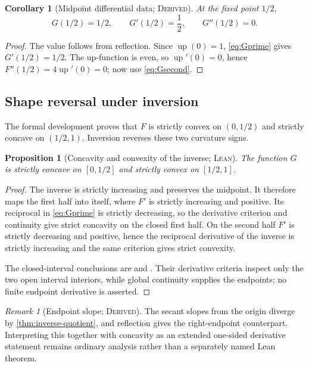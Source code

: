 \documentclass[11pt,oneside]{article}
\newtheorem{proposition}[theorem]{Proposition}
\newtheorem{corollary}[theorem]{Corollary}
\theoremstyle{definition}
\theoremstyle{remark}
\newtheorem{remark}[theorem]{Remark}
\newcommand{\Up}{\operatorname{up}}
\newcommand{\InvF}{G}
\newcommand{\Formalized}{\textsc{Lean}}
\newcommand{\Derived}{\textsc{Derived}}
\begin{document}
\begin{corollary}[Midpoint differential data; \Derived]
\label{cor:midpoint-inverse}
At the fixed point $1/2$,
\[
 \InvF(1/2)=1/2,\qquad
 \InvF'(1/2)=\frac12,\qquad
 \InvF''(1/2)=0.
\]
\end{corollary}

\begin{proof}
The value follows from reflection.  Since $\Up(0)=1$,
\eqref{eq:Gprime} gives $\InvF'(1/2)=1/2$.  The up-function is even, so
$\Up'(0)=0$, hence $F''(1/2)=4\Up'(0)=0$; now use
\eqref{eq:Gsecond}.
\end{proof}

\subsection{Shape reversal under inversion}

The formal development proves that $F$ is strictly convex on
$(0,1/2)$ and strictly concave on $(1/2,1)$.  Inversion reverses these
two curvature signs.

\begin{proposition}[Concavity and convexity of the inverse; \Formalized]
\label{prop:inverse-shape}
The function $\InvF$ is strictly concave on $[0,1/2]$ and strictly convex
on $[1/2,1]$.
\end{proposition}

\begin{proof}
The inverse is strictly increasing and preserves the midpoint.  It therefore
maps the first half into itself, where $F'$ is strictly increasing and
positive.  Its reciprocal in \eqref{eq:Gprime} is strictly decreasing, so the
derivative criterion and continuity give strict concavity on the closed first
half.  On the second half $F'$ is strictly decreasing and positive, hence the
reciprocal derivative of the inverse is strictly increasing and the same
criterion gives strict convexity.

The closed-interval conclusions are
 and
.  Their derivative criteria inspect
only the two open interval interiors, while global continuity supplies the
endpoints; no finite endpoint derivative is asserted.
\end{proof}

\begin{remark}[Endpoint slope; \Derived]
The secant slopes from the origin diverge by \cref{thm:inverse-quotient}, and
reflection gives the right-endpoint counterpart.  Interpreting this together
with concavity as an extended one-sided derivative statement remains ordinary
analysis rather than a separately named Lean theorem.
\end{remark}
\end{document}
